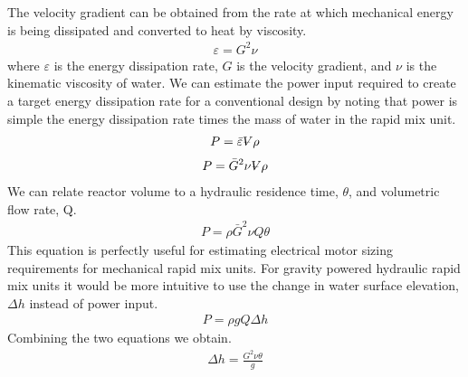 \documentclass[letterpaper,10pt,english]{sphinxmanual}
\begin{document}
The velocity gradient can be obtained from the rate at which mechanical energy is being dissipated and converted to heat by viscosity.
\begin{equation}\label{equation:Rapid_Mix/RM_Intro:Rapid_Mix/RM_Intro:4}
\begin{split}\varepsilon = G^2 \nu\end{split}
\end{equation}
where \(\varepsilon\) is the energy dissipation rate, \(G\) is the velocity gradient, and \(\nu\) is the kinematic viscosity of water. We can estimate the power input required to create a target energy dissipation rate for a conventional design by noting that power is simple the energy dissipation rate times the mass of water in the rapid mix unit.
\begin{equation}\label{equation:Rapid_Mix/RM_Intro:Rapid_Mix/RM_Intro:5}
\begin{split}P = \bar\varepsilon \rlap{\kern.08em--}V \rho\end{split}
\end{equation}\begin{equation}\label{equation:Rapid_Mix/RM_Intro:Rapid_Mix/RM_Intro:6}
\begin{split}P = \bar G^2 \nu \rlap{\kern.08em--}V \rho\end{split}
\end{equation}
We can relate reactor volume to a hydraulic residence time, \(\theta\), and volumetric flow rate, Q.
\begin{equation}\label{equation:Rapid_Mix/RM_Intro:Rapid_Mix/RM_Intro:7}
\begin{split}P = \rho \bar G^2 \nu Q \theta\end{split}
\end{equation}
This equation is perfectly useful for estimating electrical motor sizing requirements for mechanical rapid mix units. For gravity powered hydraulic rapid mix units it would be more intuitive to use the change in water surface elevation, \(\Delta h\) instead of power input.
\begin{equation}\label{equation:Rapid_Mix/RM_Intro:Rapid_Mix/RM_Intro:8}
\begin{split}P = \rho g Q \Delta h\end{split}
\end{equation}
Combining the two equations we obtain.
\begin{equation}\label{equation:Rapid_Mix/RM_Intro:Rapid_Mix/RM_Intro:9}
\begin{split}\Delta h =   \frac{G^2 \nu \theta}{g}\end{split}
\end{equation}
\end{document}
